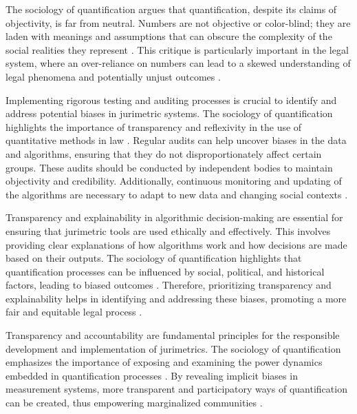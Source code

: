 The sociology of quantification argues that quantification, despite its claims of objectivity, is far from neutral. Numbers are not objective or color-blind; they are laden with meanings and assumptions that can obscure the complexity of the social realities they represent \cite{10.5040/9781350220645,10.1590/dados.2022.65.3.267}. This critique is particularly important in the legal system, where an over-reliance on numbers can lead to a skewed understanding of legal phenomena and potentially unjust outcomes \cite{10.1057/s41599-020-00557-0, de2010jurimetrics}.

Implementing rigorous testing and auditing processes is crucial to identify and address potential biases in jurimetric systems. The sociology of quantification highlights the importance of transparency and reflexivity in the use of quantitative methods in law \cite{10.1007/s11186-021-09453-1,10.1057/s41599-020-0396-5}. Regular audits can help uncover biases in the data and algorithms, ensuring that they do not disproportionately affect certain groups. These audits should be conducted by independent bodies to maintain objectivity and credibility. Additionally, continuous monitoring and updating of the algorithms are necessary to adapt to new data and changing social contexts \cite{10.1007/s11186-021-09453-1,10.1057/s41599-020-0396-5}.

Transparency and explainability in algorithmic decision-making are essential for ensuring that jurimetric tools are used ethically and effectively. This involves providing clear explanations of how algorithms work and how decisions are made based on their outputs. The sociology of quantification highlights that quantification processes can be influenced by social, political, and historical factors, leading to biased outcomes \cite{10.1007/s11186-021-09453-1,1023071190721}. Therefore, prioritizing transparency and explainability helps in identifying and addressing these biases, promoting a more fair and equitable legal process \cite{10.1007/s11186-021-09453-1,1023071190721}.

Transparency and accountability are fundamental principles for the responsible development and implementation of jurimetrics. The sociology of quantification emphasizes the importance of exposing and examining the power dynamics embedded in quantification processes \cite{10.1057/s41599-020-00557-0,10.1080/07329113.2015.1046739}. By revealing implicit biases in measurement systems, more transparent and participatory ways of quantification can be created, thus empowering marginalized communities \cite{10.1057/s41599-020-00557-0,10.1080/07329113.2015.1046739}.

